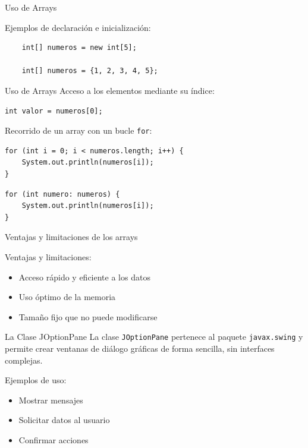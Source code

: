 \documentclass{beamer}
\begin{document}
\begin{frame}[fragile]{Uso de Arrays}

Ejemplos de declaración e inicialización:
    \begin{verbatim}
    int[] numeros = new int[5];

    int[] numeros = {1, 2, 3, 4, 5};
    \end{verbatim}

\end{frame}


\begin{frame}[fragile]{Uso de Arrays}
Acceso a los elementos mediante su índice:
\begin{verbatim}
int valor = numeros[0];
\end{verbatim}

Recorrido de un array con un bucle \texttt{for}:
\begin{verbatim}
for (int i = 0; i < numeros.length; i++) {
    System.out.println(numeros[i]);
}
\end{verbatim}

\begin{verbatim}
for (int numero: numeros) {
    System.out.println(numeros[i]);
}
\end{verbatim}

\end{frame}


\begin{frame}[fragile]{Ventajas y limitaciones de los arrays}

Ventajas y limitaciones:
\begin{itemize}
    \item Acceso rápido y eficiente a los datos
    \item Uso óptimo de la memoria
    \item Tamaño fijo que no puede modificarse
\end{itemize}
\end{frame}


\begin{frame}[fragile]{La Clase JOptionPane}
La clase \texttt{JOptionPane} pertenece al paquete \texttt{javax.swing} y permite crear ventanas de diálogo gráficas de forma sencilla, sin interfaces complejas.

Ejemplos de uso:
\begin{itemize}
    \item Mostrar mensajes
    \item Solicitar datos al usuario
    \item Confirmar acciones
\end{itemize}

\end{frame}
\end{document}
